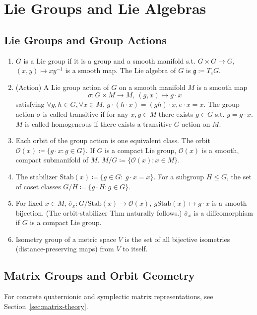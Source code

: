 \section{Lie Groups and Lie Algebras}
\label{sec:lie-theory}

\subsection{Lie Groups and Group Actions}
\label{sec:lie-groups}
\begin{enumerate}
    \item $G$ is a Lie group if it is a group and a smooth manifold s.t. $G\times G \to G$, $(x,y) \mapsto xy^{-1}$ is a smooth map. The Lie algebra of $G$ is $\mathfrak{g}\coloneqq T_e G$.
    \item (Action) A Lie group action of $G$ on a smooth manifold $M$ is a smooth map \[\sigma: G\times M \to M, \ (g,x) \mapsto g\cdot x\]
    satisfying $\forall g,h\in G, \forall x\in M$, $g\cdot(h\cdot x) = (gh) \cdot x, e\cdot x=x$. The group action $\sigma$ is called transitive if for any $x,y\in M$ there exists $g\in G$ s.t. $y=g\cdot x$. $M$ is called homogeneous if there exists a transitive $G$-action on $M$.
    \item Each orbit of the group action is one equivalent class. The orbit $\mathcal{O}(x) \coloneqq \{g\cdot x: g\in G\}$. If $G$ is a compact Lie group, $\mathcal{O}(x)$ is a smooth, compact submanifold of $M$. $M/G \coloneqq \{ \mathcal{O}(x): x\in M \}$. \cite[Section~2.1]{Helmke_1994_optim}
    \item The stabilizer $\text{Stab}(x)\coloneqq \{g \in G: \ g\cdot x=x\}$. For a subgroup $H \le G$, the set of coset classes $G/H\coloneqq\{g\cdot H: g\in G\}$. \cite[Section~2.1]{Helmke_1994_optim}
    \item For fixed $x\in M$, $\overline{\sigma}_x: G/\text{Stab}(x) \to \mathcal{O}(x), \ g \text{Stab}(x) \mapsto g\cdot x$ is a smooth bijection. (The orbit-stabilizer Thm naturally follows.) $\overline{\sigma}_x$ is a diffeomorphism if $G$ is a compact Lie group. \cite[Section~2.1]{Helmke_1994_optim}
    \item Isometry group of a metric space $V$ is the set of all bijective isometries (distance-preserving maps) from $V$ to itself.
\end{enumerate}

\subsection{Matrix Groups and Orbit Geometry}
\label{sec:matrix-group-geometry}
For concrete quaternionic and symplectic matrix representations, see Section~\ref{sec:matrix-theory}.


